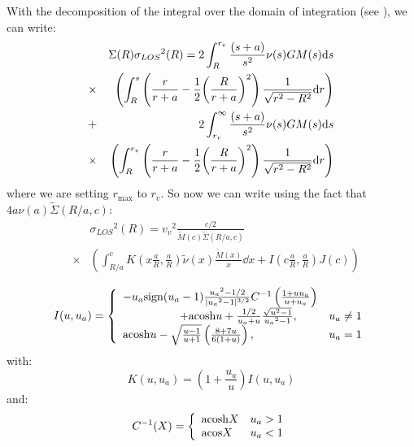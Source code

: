 With the decomposition of the integral over the domain of integration (see
), we can write:
%
\begin{eqnarray}
    &&\Sigma{(R)}{\sigma_{LOS}}^2{(R)}=
        2\int_R^{r_v}{\frac{\left({s+a}\right)}{s^2}{\nu(s)}{G}{M(s)}}{{\rm{d}}{s}}
        \nonumber\\
    &\times&
        \left(\int_R^s{\left(\frac{r}{r+a}-\frac{1}{2}
        {\left(\frac{R}{r+a}\right)}^2\right)
        \frac{1}{\sqrt{r^2-R^2}}{\rm{d}}{r}}\right)\nonumber\\
    &+&2\int_{r_v}^{\infty}
        \frac{\left({s+a}\right)}{s^2}\nu(s){G}{M(s)}{\rm{d}}{s}\nonumber\\
    &\times&
        \left(\int_R^{r_v}
            \left(\frac{r}{r+a}-\frac{1}{2}{\left(\frac{R}{r+a}\right)}^2\right)
            \frac{1}{\sqrt{r^2-R^2}}{\rm{d}}{r}\right)\nonumber\\
\end{eqnarray}
%
where we are setting $r_{\max}$ to $r_v$. So now we can write using the
fact that $4a\nu(a)\widetilde{\Sigma}(R/a,c)$:
%
\begin{eqnarray}
    &&{\sigma_{LOS}}^2{(R)}={v_v}^2\frac{c/2}{\widetilde{M}{(c)}\widetilde{\Sigma}{(R/a,c)}}\nonumber\\
    &\times&\left(\int_{R/a}^c{{K}\left({x\frac{a}{R},\frac{a}{R}}\right)}\widetilde{\nu}{(x)}
    \frac{\widetilde{M}{(x)}}{x}\dd{x}+I\left({c\frac{a}{R},\frac{a}{R}}\right){J(c)}\right)\nonumber\\
\end{eqnarray}
%
\begin{equation}
    I(u,u_a)=\left\{\begin{array}{lr}
        -u_a{\rm{sign}}(u_a-1)\frac{{u_a}^2-1/2}{|{u_a}^2-1|^{3/2}}{C^{-1}\left(\frac{1+u{u_a}}{u+u_a}\right)}&\\
        \hspace{5em}+{\rm{acosh}}{u}+\frac{1/2}{u_a+u}\frac{\sqrt{u^2-1}}{{u_a}^2-1},&{u_a}\neq1\\
        {\rm{acosh}}{u}-\sqrt{\frac{u-1}{u+1}}\left(\frac{8+7u}{6(1+u)}\right),&{u_a}=1\\
    \end{array}\right.
\end{equation}
%
with:
%
\begin{equation}
    K(u,u_a)=\left({1+\frac{u_a}{u}}\right){I(u,u_a)}
\end{equation}
%
and:
%
\begin{equation}
    C^{-1}(X)=\left\{\begin{array}{lr}
        {\rm{acosh}}{X}&u_a>1\\
        {\rm{acos}}{X}&u_a<1\\
    \end{array}\right.
\end{equation}
